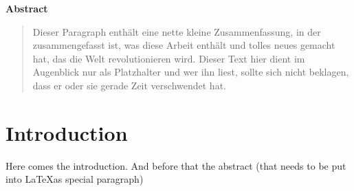 \begin{center}
\small{\textbf{Abstract}}
\end{center}

\begin{abstract}
\noindent \small{Dieser Paragraph enthält eine nette kleine Zusammenfassung, in der zusammengefasst ist, was diese Arbeit enthält und tolles neues gemacht hat, das die Welt revolutionieren wird. Dieser Text hier dient im Augenblick nur als Platzhalter und wer ihn liest, sollte sich nicht beklagen, dass er oder sie gerade Zeit verschwendet hat.}
\end{abstract}

\section{Introduction}
Here comes the introduction. And before that the abstract (that needs to be put into \LaTeX as special paragraph)\newpage
